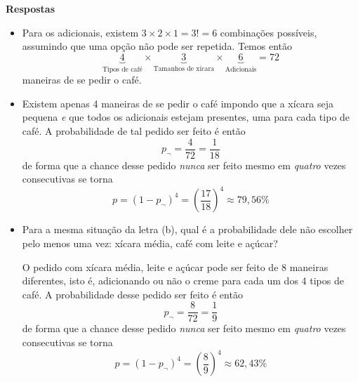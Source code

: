 \documentclass{article}
\begin{document}
\noindent\textbf{\sffamily Respostas}
\begin{itemize}
    \item [a)] 
    Para os adicionais, existem $3\times 2\times 1 = 3! = 6$ combinações possíveis, assumindo que uma opção não pode ser repetida. 
    Temos então
    \begin{equation*}
    \boxed{
        \underbrace{4}_{\text{Tipos de café}} \times 
        \underbrace{3}_{\text{Tamanhos de xícara}} \times 
        \underbrace{6}_{\text{Adicionais}} 
        = 72
    }
    \end{equation*}
    maneiras de se pedir o café.
    
    \item [b)] 
    Existem apenas 4 maneiras de se pedir o café impondo que a xícara seja pequena \emph{e} que todos os adicionais estejam presentes, uma para cada tipo de café. 
    A probabilidade de tal pedido ser feito é então 
    \begin{equation*}
        p_\neg = 
        \frac{4}{72} =
        \frac{1}{18}
    \end{equation*}
    de forma que a chance desse pedido \emph{nunca} ser feito mesmo em \emph{quatro} vezes consecutivas se torna
    \begin{equation*}
    \boxed{
        p = 
        (1 - p_\neg)^4 = 
        \left(\frac{17}{18}\right)^4 \approx
        79,56\%
    }
    \end{equation*}
    

    \item [c)]
    Para a mesma situação da letra (b), qual é a probabilidade dele não escolher pelo menos uma vez: xícara média, café com leite e açúcar?

    O pedido com xícara média, leite e açúcar pode ser feito de 8 maneiras diferentes, isto é, adicionando ou não o creme para cada um dos 4 tipos de café. A probabilidade desse pedido ser feito é então
    \begin{equation*}
        p_\neg = 
        \frac{8}{72} =
        \frac{1}{9}
    \end{equation*}
    de forma que a chance desse pedido \emph{nunca} ser feito mesmo em \emph{quatro} vezes consecutivas se torna
    \begin{equation*}
    \boxed{
        p = 
        (1 - p_\neg)^4 = 
        \left(\frac{8}{9}\right)^4 \approx
        62,43\%
    }
    \end{equation*}
\end{itemize}
\end{document}
